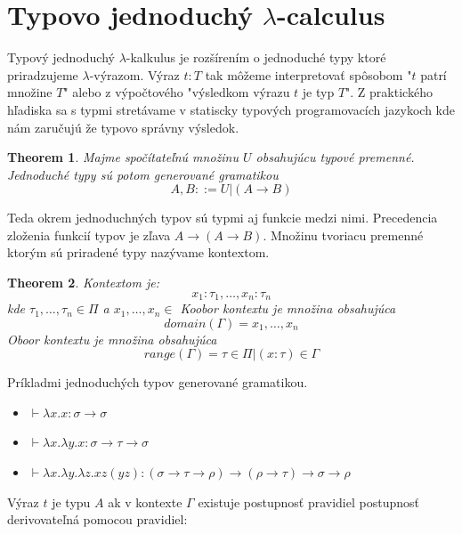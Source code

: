 \documentclass[a4paper,10pt,oneside]{report}%
\newtheorem{theorem}{Theorem}
\begin{document}
\section{Typovo jednoduchý $\lambda$-calculus}
    Typový jednoduchý $\lambda$-kalkulus je rozšírením o jednoduché typy ktoré
priradzujeme $\lambda$-výrazom.
    Výraz $t : T$ tak môžeme interpretovať spôsobom "$t$ patrí množine $T$" alebo
z výpočtového "výsledkom výrazu $t$ je typ $T$". Z praktického hľadiska sa s typmi
stretávame v statiscky typových programovacích jazykoch kde nám zaručujú že typovo
správny výsledok.
\begin{theorem}
    Majme spočítateľnú množinu $U$ obsahujúcu typové premenné. Jednoduché typy
    sú potom generované gramatikou
    \begin{equation*}
        A,B ::= U | (A \to B)
    \end{equation*}
\end{theorem}
    Teda okrem jednoduchných typov sú typmi aj funkcie medzi nimi.
Precedencia zloženia funkcií typov je zľava $A \to ( A  \to B )$. Množinu
tvoriacu premenné ktorým sú priradené typy nazývame kontextom.
\begin{theorem}
    Kontextom je:
    \begin{equation*}
        { x_{1} : \tau_{1}, \dots, x_{n} : \tau_{n} }
    \end{equation*}
    kde $\tau_{1}, \dots, \tau_{n} \in \Pi$ a $x_{1}, \dots , x_{n} \in$
    Koobor kontextu je množina obsahujúca
    \begin{equation*}
        domain(\Gamma) = { x_{1}, \dots, x_{n} }
    \end{equation*}
    Oboor kontextu je množina obsahujúca
    \begin{equation*}
        range( \Gamma ) = { \tau \in \Pi  | (x : \tau ) \in \Gamma }
    \end{equation*}
\end{theorem}
Príkladmi jednoduchých typov generované gramatikou.
\begin{itemize}
    \item $\vdash \lambda x.x : \sigma \to \sigma$
    \item $\vdash \lambda x. \lambda y.x : \sigma \to \tau \to \sigma$
    \item $\vdash \lambda x. \lambda y. \lambda z.x z (y z): (\sigma \to \tau \to \rho) \to (\rho \to \tau) \to \sigma \to \rho$
\end{itemize}

Výraz $t$ je typu $A$ ak v kontexte $\Gamma$ existuje postupnosť pravidiel postupnosť derivovateľná pomocou pravidiel:
\end{document}
